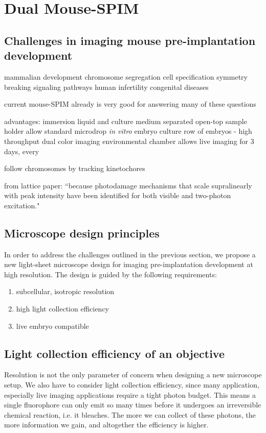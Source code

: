 

\chapter{Dual Mouse-SPIM}

\graphicspath{{./figures/2_DualMouse/}}

\section{Challenges in imaging mouse pre-implantation development}
  mammalian development
  chromosome segregation
  cell specification
  symmetry breaking
  signaling pathways
  human infertility
  congenital diseases 

  current mouse-SPIM \cite{strnad_inverted_2016} already is very good for answering many of these questions

  advantages:
    immersion liquid and culture medium separated
    open-top sample holder allow standard microdrop \textit{in vitro} embryo culture
    row of embryos - high throughput
    dual color imaging
    environmental chamber allows live imaging for 3 days, every 

  follow chromosomes by tracking kinetochores

  from lattice paper: ``because photodamage mechanisms that scale supralinearly with peak intensity have been identified for both visible \cite{donnert_major_2007} and two-photon \cite{ji_high-speed_2008} excitation."

\section{Microscope design principles}
  In order to address the challenges outlined in the previous section, we propose a new light-sheet microscope design for imaging pre-implantation development at high resolution. The design is guided by the following requirements:
  \begin{enumerate}
    \item subcellular, isotropic resolution
    \item high light collection efficiency
    \item live embryo compatible
  \end{enumerate} 

\section{Light collection efficiency of an objective}
  Resolution is not the only parameter of concern when designing a new microscope setup. We also have to consider light collection efficiency, since many application, especially live imaging applications require a tight photon budget. This means a single fluorophore can only emit so many times before it undergoes an irreversible chemical reaction, i.e. it bleaches. The more we can collect of these photons, the more information we gain, and altogether the efficiency is higher.

